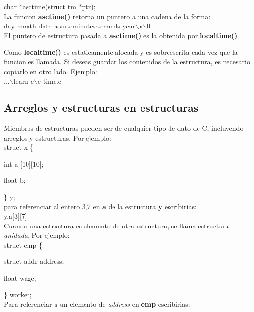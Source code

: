 \documentclass[]{article}
\begin{document}
				char *asctime(struct tm *ptr);\\
				
				La funcion \textbf{asctime()} retorna un puntero a una cadena de la forma:\\
				
				day month date hours:minutes:seconds year$\backslash$n$\backslash$0\\
				
				El puntero de estructura pasada a \textbf{asctime()} es la obtenida por \textbf{localtime()}
				
				Como \textbf{localtime()} es estaticamente alocada y es sobreescrita cada vez que la funcion es llamada. Si deseas guardar los contenidos de la estructura, es necesario copiarlo en otro lado. Ejemplo:\\
				
				...$\backslash$learn c$\backslash$c time.c\\
				
			\subsection{Arreglos y estructuras en estructuras}
				
			Miembros de estructuras pueden ser de cualquier tipo de dato de C, incluyendo arreglos y estructuras. Por ejemplo:\\
				
			struct x \{
				
			int a [10][10];
				
			float b;
				
			\} y;\\
				
			para referenciar al entero 3,7 en \textbf{a} de la estructura \textbf{y} escribirias:\\
				
			y.a[3][7];\\
				
			Cuando una estructura es elemento de otra estructura, se llama estructura \textit{anidada}. Por ejemplo:\\
				
			struct emp \{
				
			struct addr address;
				
			float wage;
			
			\} worker;\\
				
				
			Para referenciar a un elemento de \textit{address} en \textbf{emp} escribirias:\\
				
\end{document}
